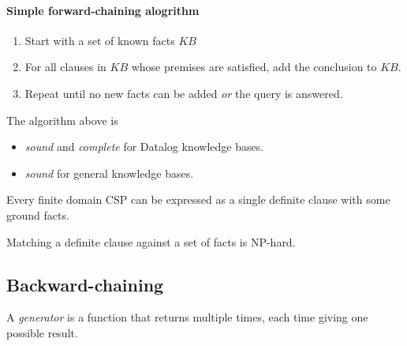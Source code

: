 \documentclass{article}
\begin{document}
\paragraph{Simple forward-chaining alogrithm}

\begin{enumerate}
    \item Start with a set of known facts $KB$
    \item For all clauses in $KB$ whose premises are satisfied, add the conclusion to $KB$.
    \item Repeat until no new facts can be added \emph{or} the query is answered.
\end{enumerate}

\begin{theorem}
    The algorithm above is
    \begin{itemize}
        \item \emph{sound} and \emph{complete} for Datalog knowledge bases.
        \item \emph{sound} for general knowledge bases.
    \end{itemize}
\end{theorem}

\begin{theorem}
    Every finite domain CSP can be expressed as a 
    single definite clause with some ground facts.
\end{theorem}

\begin{theorem}
    Matching a definite clause against a set of facts is NP-hard.
\end{theorem}

\subsection{Backward-chaining}

\begin{definition}
    A \emph{generator} is a function that returns multiple times, each time giving one
    possible result.
\end{definition}
\end{document}
